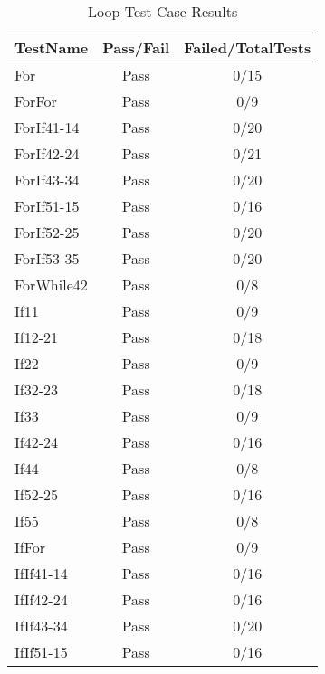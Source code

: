 \begin{table}[htbp!]
\centering
\caption{ Loop Test Case Results}
      \begin{tabular}{lcc}
      \hline\hline
          TestName & Pass/Fail & Failed/TotalTests \\
         \hline
         For & Pass & 0/15 \\
         ForFor & Pass & 0/9 \\
         ForIf41-14 & Pass & 0/20 \\
         ForIf42-24 & Pass & 0/21 \\
         ForIf43-34 & Pass & 0/20 \\
         ForIf51-15 & Pass & 0/16 \\
         ForIf52-25 & Pass & 0/20 \\
         ForIf53-35 & Pass & 0/20 \\
         ForWhile42 & Pass & 0/8 \\
         If11 & Pass & 0/9 \\
         If12-21 & Pass & 0/18 \\
         If22 & Pass & 0/9 \\
         If32-23 & Pass & 0/18 \\
         If33 & Pass & 0/9 \\
         If42-24 & Pass & 0/16 \\
         If44 & Pass & 0/8 \\
         If52-25 & Pass & 0/16 \\
         If55 & Pass & 0/8 \\
         IfFor & Pass & 0/9 \\
         IfIf41-14 & Pass & 0/16 \\
         IfIf42-24 & Pass & 0/16 \\
         IfIf43-34 & Pass & 0/20 \\
         IfIf51-15 & Pass & 0/16 \\

\end{tabular}
\end{table}
